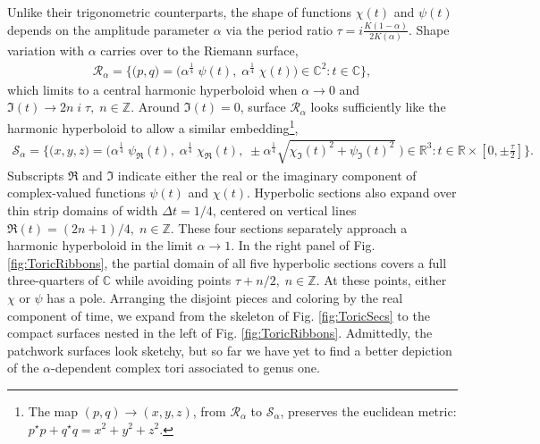 \documentclass[nofootinbib,preprint]{revtex4-1}
\begin{document}
Unlike their trigonometric counterparts, the shape of functions $\chi(t)$ and $\psi(t)$ 
depends on the amplitude parameter $\alpha$ via the period ratio $\tau=i\frac{K(1-\alpha)}{2K(\alpha)}$. 
Shape variation with $\alpha$ carries over to the Riemann surface,
\begin{eqnarray}
\mathcal{R}_{\alpha} = \Big\{\big(p,q\big)
=\big(\alpha^{\frac{1}{4}} \;\psi(t), \; \alpha^{\frac{1}{4}} \;\chi(t)\big) 
\in \mathbb{C}^2 : t \in \mathbb{C} \Big\}, \nonumber
\end{eqnarray}
which limits to a central harmonic hyperboloid when $\alpha \rightarrow 0$ 
and $\mathfrak{I}(t) \rightarrow 2n\; i\; \tau, \; n \in \mathbb{Z}$. Around 
$\mathfrak{I}(t)=0$, surface $\mathcal{R}_{\alpha}$ looks sufficiently like the 
harmonic hyperboloid to allow a similar embedding\footnote{The map  
$(p,q) \rightarrow (x,y,z)$, from $\mathcal{R}_{\alpha}$ to $\mathcal{S}_{\alpha}$, 
preserves the euclidean metric: $p^{\star}p+q^{\star}q=x^2+y^2+z^2$.},
\begin{eqnarray}
\mathcal{S}_{\alpha} = \Big\{\big(x,y,z\big)
=\big(
\alpha^{\frac{1}{4}}\;\psi_{\mathfrak{R}}(t),
\; \alpha^{\frac{1}{4}}\;\chi_{\mathfrak{R}}(t), 
\;\pm \alpha^{\frac{1}{4}} \sqrt{\chi_{\mathfrak{I}}(t)^2+\psi_{\mathfrak{I}}(t)^2} \; \big) 
\in \mathbb{R}^3 : t \in \mathbb{R} \times[0,\pm \tfrac{\tau}{2}] \Big\}. \nonumber
\end{eqnarray}
Subscripts $\mathfrak{R}$ and $\mathfrak{I}$ indicate either the real or the imaginary 
component of complex-valued functions $\psi(t)$ and $\chi(t)$. Hyperbolic sections also 
expand over thin strip domains of width $\Delta t =1/4$, centered on vertical lines 
$\mathfrak{R}(t)=(2n+1)/4, \; n \in \mathbb{Z}$. These four sections separately approach a 
harmonic hyperboloid in the limit $\alpha \rightarrow 1$. In the right panel of Fig. \ref{fig:ToricRibbons},
the partial domain of all five hyperbolic sections covers a full three-quarters of $\mathbb{C}$
while avoiding points $\tau + n/2, \; n\in \mathbb{Z}$. At these points, either $\chi$ or $\psi$ has 
a pole. Arranging the disjoint pieces and coloring by the real component of time, we expand from 
the skeleton of Fig. \ref{fig:ToricSecs} to the compact surfaces nested in the left of 
Fig. \ref{fig:ToricRibbons}. Admittedly, the patchwork surfaces look sketchy, but so far we have 
yet to find a better depiction of the $\alpha$-dependent complex tori associated to genus one. 
\end{document}
